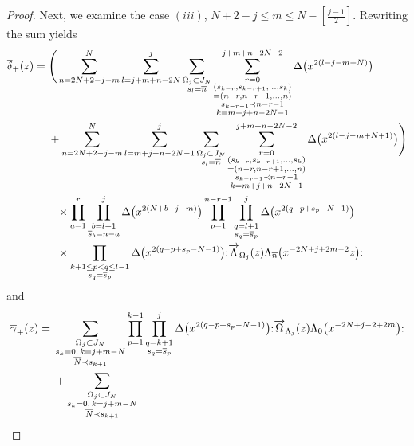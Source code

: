 \documentclass[10pt,a4paper]{amsart}
\numberwithin{equation}{section}
\begin{document}
\begin{proof}
Next, we examine the case $(iii)$, $N+2-j \leq m \leq N-[\frac{j-1}{2}]$.
Rewriting the sum yields
\begin{align}
\overline{\delta}_+(z)={}&
\Bigg(\sum_{n=2N+2-j-m}^{N}\sum_{l=j+m+n-2N}^{j}
\sum\limits_{\substack{\Omega_j \subset J_N\\s_l=\overline{n}}}
\sum\limits_{\substack{r=0\\(s_{k-r}, s_{k-r+1},\dots,s_{k})\\=
(n-r, n-r+1,\dots, n)\\s_{k-r-1} \prec n-r-1\\ k=m+j+n-2N-1}}^{j+m+n-2N-2}
\Delta\big(x^{2(l-j-m+N)}\big)\notag
\\
&+\sum_{n=2N+2-j-m}^{N}\sum_{l=m+j+n-2N-1}^j
\sum\limits_{\substack{\Omega_j \subset J_N \\s_l=\overline{n}}}
\sum\limits_{\substack{r=0\\(s_{k-r}, s_{k-r+1},\dots,s_{k})\\=(n-r, n-r+1,\dots, n)
\\s_{k-r-1} \prec n-r-1\\ k=m+j+n-2N-1}}^{j+m+n-2N-2}
\Delta\big(x^{2(l-j-m+N+1)}\big)\Bigg)\notag
\\
&\phantom{+}\times\prod_{a=1}^r \prod\limits_{\substack{b=l+1\\\overline{s}_b=n-a}}^j
\Delta\big(x^{2(N+b-j-m)}\big)\prod_{p=1}^{n-r-1}
\prod\limits_{\substack{q=l+1\\ s_q=\overline{s}_p}}^j
\Delta\big(x^{2(q-p+s_p-N-1)}\big)\notag
\\
&\phantom{+}\times\prod\limits_{\substack{k+1 \leq p<q \leq l-1\\s_q=\overline{s}_p}}
\Delta\big(x^{2(q-p+s_p-N-1)}\big)
{:}\overrightarrow{\Lambda}_{\Omega_j}(z)\Lambda_{\overline{n}}\big(x^{-2N+j+2m-2}z\big){:}
\label{eqn:bdelta+}
\end{align}
and
\begin{align}
\overline{\gamma}_+(z)={}&\sum\limits_{\substack{\Omega_j \subset J_N
\\s_k=0,\, k=j+m-N\\ \overline{N}\prec s_{k+1}}}
\prod_{p=1}^{k-1}\prod\limits_{\substack{q=k+1\\ s_q=\overline{s}_p}}^j
\Delta\big(x^{2(q-p+s_p-N-1)}\big)
{:}\overrightarrow{\Omega}_{\Lambda_j}(z)\Lambda_0\big(x^{-2N+j-2+2m}\big){:}\notag
\\
&+\sum\limits_{\substack{\Omega_j \subset J_N\\s_k=0,\, k=j+m-N
\\ \overline{N}\prec s_{k+1}}}

\end{align}
\end{proof}
\end{document}

